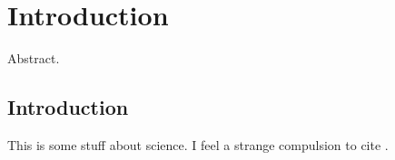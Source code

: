 \chapter{Introduction}
\label{c.intro}

\begin{chabstract}
  Abstract.
\end{chabstract}

\section{Introduction}

This is some stuff about science. I feel a strange compulsion to cite
\citet{williams12}.
